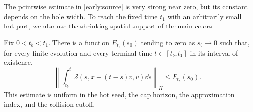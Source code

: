 The pointwise estimate in \eqref{early:source} is very strong near zero,
but its constant depends on the hole width. To reach the fixed time
$t_1$ with an arbitrarily small hot part, we also use the shrinking
spatial support of the main colors.

\begin{lemma}\label{early:path-source}
Fix $0<t_b<t_1$. There is a function $E_{t_b}(s_0)$ tending to zero as
$s_0\to0$ such that, for every finite evolution and every terminal time
$t\in[t_b,t_1]$ in its interval of existence,
\begin{equation}\label{early:source-integral}
 \left\|\int_{t_b}^t
    \mathcal S(s,x-(t-s)v,v)\dd s\right\|_H
 \le E_{t_b}(s_0).
\end{equation}
This estimate is uniform in the hot seed, the cap horizon, the
approximation index, and the collision cutoff.
\end{lemma}

